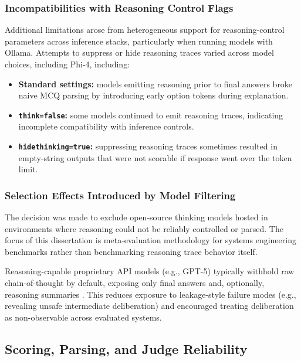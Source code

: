 \subsubsection{Incompatibilities with Reasoning Control Flags}

Additional limitations arose from heterogeneous support for reasoning-control parameters across inference stacks, particularly when running models with Ollama. Attempts to suppress or hide reasoning traces varied across model choices, including Phi-4, including:

\begin{itemize}
    \item \textbf{Standard settings:} models emitting reasoning prior to final answers broke naive MCQ parsing by introducing early option tokens during explanation.
    \item \textbf{\texttt{think=false}:} some models continued to emit reasoning traces, indicating incomplete compatibility with inference controls.
    \item \textbf{\texttt{hidethinking=true}:} suppressing reasoning traces sometimes resulted in empty-string outputs that were not scorable if response went over the token limit.
\end{itemize}


\subsubsection{Selection Effects Introduced by Model Filtering}

The decision was made to exclude open-source thinking models hosted in environments where reasoning could not be reliably controlled or parsed. The focus of this dissertation is meta-evaluation methodology for systems engineering benchmarks rather than benchmarking reasoning trace behavior itself.

Reasoning-capable proprietary API models (e.g., GPT-5) typically withhold raw chain-of-thought by default, exposing only final answers and, optionally, reasoning summaries \cite{openai_ReasoningModels_2025}. This reduces exposure to leakage-style failure modes (e.g., revealing unsafe intermediate deliberation) and encouraged treating deliberation as non-observable across evaluated systems.


\subsection{Scoring, Parsing, and Judge Reliability}

